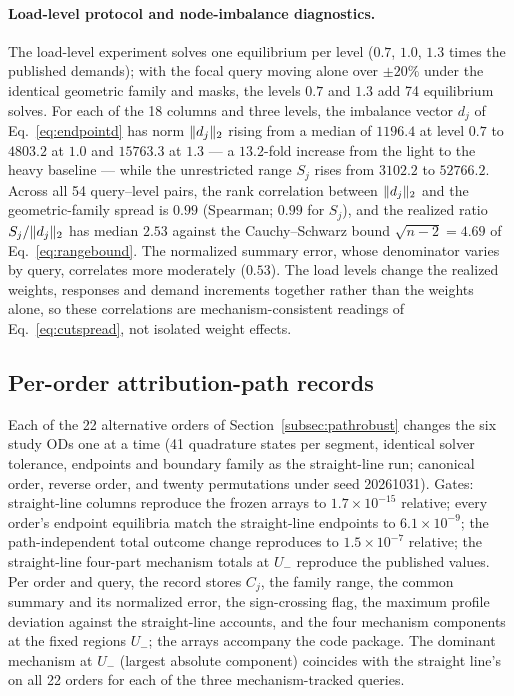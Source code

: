 \paragraph{Load-level protocol and node-imbalance diagnostics.}
The load-level experiment solves one equilibrium per level ($0.7$,
$1.0$, $1.3$ times the published demands); with the focal query moving
alone over $\pm20\%$ under the identical geometric family and masks,
the levels $0.7$ and $1.3$ add 74 equilibrium solves. For each of the
18 columns and three levels, the imbalance vector $d_j$ of
Eq.~\eqref{eq:endpointd} has norm $\lVert d_j \rVert_2$ rising from a median
of $1196.4$ at level $0.7$ to $4803.2$ at $1.0$ and $15763.3$ at
$1.3$ --- a $13.2$-fold increase from the light to the heavy baseline
--- while the unrestricted range $S_j$ rises from $3102.2$ to
$52766.2$. Across all 54 query--level pairs, the rank correlation
between $\lVert d_j \rVert_2$ and the geometric-family spread is $0.99$
(Spearman; $0.99$ for $S_j$), and the realized ratio
$S_j/\lVert d_j \rVert_2$ has median $2.53$ against the Cauchy--Schwarz bound
$\sqrt{n-2}=4.69$ of Eq.~\eqref{eq:rangebound}. The normalized
summary error, whose denominator varies by query, correlates more
moderately ($0.53$). The load levels change the realized weights,
responses and demand increments together rather than the weights alone,
so these correlations are mechanism-consistent readings of
Eq.~\eqref{eq:cutspread}, not isolated weight effects.

\subsection{Per-order attribution-path records}\label{supp:pathrobust}
Each of the 22 alternative orders of Section~\ref{subsec:pathrobust}
changes the six study ODs one at a time (41 quadrature states per
segment, identical solver tolerance, endpoints and boundary family as
the straight-line run; canonical order, reverse order, and twenty
permutations under seed 20261031). Gates: straight-line columns
reproduce the frozen arrays to $1.7\times10^{-15}$ relative; every
order's endpoint equilibria match the straight-line endpoints to
$6.1\times10^{-9}$; the path-independent total outcome change
reproduces to $1.5\times10^{-7}$ relative; the straight-line four-part
mechanism totals at $U_-$ reproduce the published values. Per order and
query, the record stores $C_j$, the family range, the common summary
and its normalized error, the sign-crossing flag, the maximum profile
deviation against the straight-line accounts, and the four mechanism
components at the fixed regions $U_-$; the arrays accompany the code
package. The dominant mechanism at $U_-$ (largest absolute component)
coincides with the straight line's on all 22 orders for each of the
three mechanism-tracked queries.
